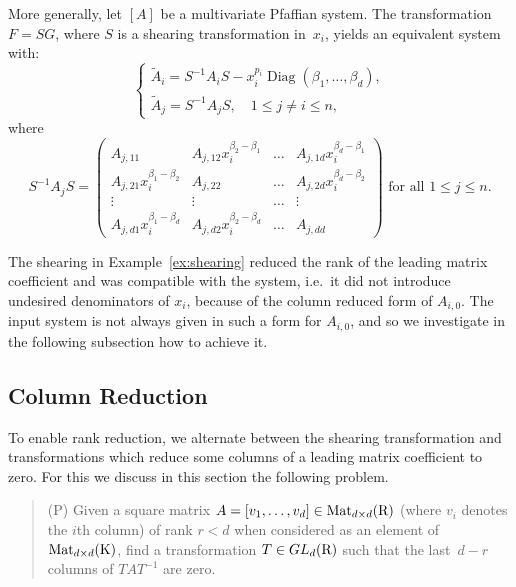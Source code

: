 \documentclass[final,1p,times,number,amsthm]{elsart}
\begin{document}
More generally, let $[A]$ be a multivariate Pfaffian system. The transformation
$F = SG$, where $S$ is a shearing transformation in~$x_i$, yields an equivalent
system with:
\[
\begin{cases} 
\tilde{A}_{i} = S^{-1} A_{i} S - x_{i}^{p_{i}}\operatorname{Diag}({\beta_1}, \dots ,
{\beta_d}), \\
\tilde{A}_{j}  = S^{-1} {A_{j}} S, \quad 1 \leq j \neq i \leq n , \end{cases}\]
where 
\[S^{-1} {A_{j}} S = \left(\begin{matrix} A_{j, 11} & A_{j,12}
      x_{i}^{\beta_2 - \beta_1} & \dots &  A_{j, 1d} x_{i}^{\beta_d - \beta_1} \\[5pt]
      A_{j, 21} x_{i}^{\beta_1 - \beta_2} & A_{j, 22} & \dots & A_{j, 2d}
      x_{i}^{\beta_d- \beta_2} \\[5pt] \vdots & \vdots & \dots & \vdots
      \\[5pt] A_{j, d1} x_{i}^{\beta_1 - \beta_d} & A_{j, d2} x_{i}^{\beta_2
        - \beta_d} & \dots & A_{j, dd} \end{matrix}\right)\text{ for all }1\leq
  j \leq n.\]

The shearing in Example~\ref{ex:shearing} reduced the rank of the leading matrix
coefficient and was compatible with the system, i.e.\ it did not introduce
undesired denominators of $x_{i}$, because of the column reduced form of
$A_{i,0}$. The input system is not always given in such a
form for $A_{i,0}$, and so we investigate in the following subsection how to
achieve it.

\subsection{Column Reduction}
\label{colpfaff}
To enable rank reduction, we alternate between the shearing transformation and
transformations which reduce some columns of a leading  matrix coefficient to
zero. For this we discuss in this section the following problem.

\medskip
\begin{quote}(P) \quad Given a square matrix
  $A=[v_{1},\dots,v_{d}]\in\operatorname{Mat}_{d\times d}({\rm R})$ (where
  $v_{i}$ denotes the $i$th column) of rank $r<d$ when considered as an element
  of $\operatorname{Mat}_{d\times d}({\rm K})$, find a
  transformation $T\in GL_d({\rm R})$ such that the last~$d-r$ columns of
  $TAT^{-1}$ are zero. \end{quote} 
\end{document}

